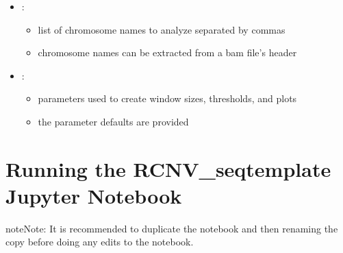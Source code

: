 \documentclass[letterpaper,10pt,english]{sphinxhowto}
\begin{document}
\begin{sphinxVerbatim}[commandchars=\\\{\}]
     
     
     
     
\end{sphinxVerbatim}
\begin{itemize}
\item {} 
\sphinxAtStartPar
{}:
\begin{itemize}
\item {} 
\sphinxAtStartPar
list of chromosome names to analyze separated by commas

\item {} 
\sphinxAtStartPar
chromosome names can be extracted from a bam file’s header

\end{itemize}

\item {} 
\sphinxAtStartPar
{}:
\begin{itemize}
\item {} 
\sphinxAtStartPar
parameters used to create window sizes, thresholds, and plots

\item {} 
\sphinxAtStartPar
the parameter defaults are provided

\end{itemize}

\end{itemize}


\section{Running the RCNV\_seq\sphinxhyphen{}template Jupyter Notebook}
\label{\detokenize{index:running-the-rcnv-seq-template-jupyter-notebook}}
\begin{sphinxadmonition}{note}{Note:}
\sphinxAtStartPar
It is recommended to duplicate the  notebook and then renaming the copy before doing any edits to the notebook.
\end{sphinxadmonition}
\end{document}
